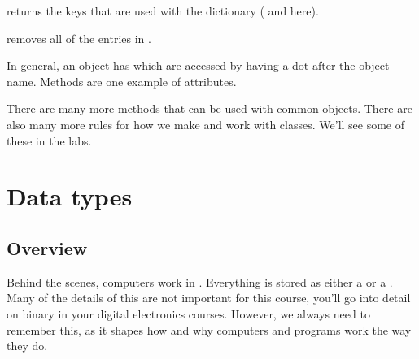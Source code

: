 \documentclass[letterpaper,10pt,british]{sphinxmanual}
\begin{document}
\begin{sphinxVerbatim}[commandchars=\\\{\}]
     
\end{sphinxVerbatim}

\sphinxAtStartPar
returns the keys that are used with the dictionary ( and  here).

\begin{sphinxVerbatim}[commandchars=\\\{\}]
\end{sphinxVerbatim}

\sphinxAtStartPar
removes all of the entries in .

\sphinxAtStartPar
In general, an object has  which are accessed by having a dot  after the object name. Methods are one example of attributes.

\sphinxAtStartPar
There are many more methods that can be used with common objects. There are also many more rules for how we make and work with classes. We’ll see some of these in the labs.

\sphinxstepscope


\section{Data types}
\label{\detokenize{chapters/programming_fundamentals/data_types:data-types}}\label{\detokenize{chapters/programming_fundamentals/data_types::doc}}

\subsection{Overview}
\label{\detokenize{chapters/programming_fundamentals/data_types:overview}}
\sphinxAtStartPar
Behind the scenes, computers work in . Everything is stored as either a  or a . Many of the details of this are not important for this course, you’ll go into detail on binary in your digital electronics courses. However, we always need to remember this, as it shapes how and why computers and programs work the way they do.
\end{document}

